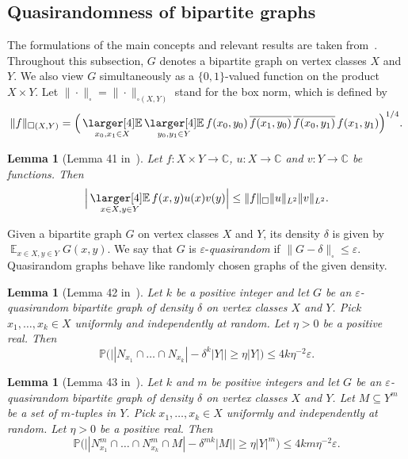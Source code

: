 \documentclass[a4paper,11pt]{article}
\numberwithin{theorem}{section}
\newtheorem{lemma}[theorem]{Lemma}
\theoremstyle{definition}
\newcommand\ex{\mathop{\mathbb{E}}}
\newcommand{\exx}{
  \mathop{
    \mathchoice{\vcenter{\hbox{\larger[4]$\mathbb{E}$}}}
               {\kern0pt\mathbb{E}}
               {\kern0pt\mathbb{E}}
               {\kern0pt\mathbb{E}}
  }\displaylimits
}
\begin{document}
\subsection{Quasirandomness of bipartite graphs}

The formulations of the main concepts and relevant results are taken from~\cite{generalBilBog}.\\
\indent Throughout this subsection, $G$ denotes a bipartite graph on vertex classes $X$ and $Y$. We also view $G$ simultaneously as a $\{0,1\}$-valued function on the product $X \times Y$. Let $\|\cdot\|_{\square} = \|\cdot\|_{\square(X, Y)}$ stand for the box norm, which is defined by 
\[\|f\|_{\square(X, Y)} = \Big(\exx_{x_0, x_1 \in X} \exx_{y_0, y_1 \in Y} f(x_0, y_0)\,\overline{f(x_1, y_0)}\,\overline{f(x_0, y_1)}\,f(x_1, y_1)\Big)^{1/4}.\]

\begin{lemma}[Lemma 41 in~\cite{generalBilBog}]\label{basicgcs}Let $f \colon X \times Y \to \mathbb{C}$, $u \colon X \to \mathbb{C}$ and $v \colon Y \to \mathbb{C}$ be functions. Then
\[\Big|\exx_{x \in X, y \in Y} f(x,y)u(x)v(y) \Big| \leq \|f\|_\square \|u\|_{L^2} \|v\|_{L^2}.\]
\end{lemma}

Given a bipartite graph $G$ on vertex classes $X$ and $Y$, its density $\delta$ is given by $\ex_{x \in X, y \in Y} G(x,y)$. We say that $G$ is $\varepsilon$-\emph{quasirandom} if $\|G - \delta\|_\square \leq \varepsilon$. Quasirandom graphs behave like randomly chosen graphs of the given density.

\begin{lemma}[Lemma 42 in~\cite{generalBilBog}]\label{appendknhoods}Let $k$ be a positive integer and let $G$ be an $\varepsilon$-quasirandom bipartite graph of density $\delta$ on vertex classes $X$ and $Y$. Pick $x_1, \dots, x_k \in X$ uniformly and independently at random. Let $\eta > 0$ be a positive real. Then 
\[\mathbb{P}\Big(\Big||N_{x_1} \cap \dots \cap N_{x_k}| - \delta^k |Y|\Big| \geq \eta |Y|\Big) \leq 4k \eta^{-2} \varepsilon.\]
\end{lemma}

\begin{lemma}[Lemma 43 in~\cite{generalBilBog}]\label{genappendknhoods}Let $k$ and $m$ be positive integers and let $G$ be an $\varepsilon$-quasirandom bipartite graph of density $\delta$ on vertex classes $X$ and $Y$. Let $M \subseteq Y^m$ be a set of $m$-tuples in $Y$. Pick $x_1, \dots, x_k \in X$ uniformly and independently at random. Let $\eta > 0$ be a positive real. Then 
\[\mathbb{P}\Big(\Big||N^m_{x_1} \cap \dots \cap N^m_{x_k} \cap M| - \delta^{mk} |M|\Big| \geq \eta |Y|^m\Big) \leq  4km \eta^{-2}\varepsilon.\]\end{lemma}
\end{document}
